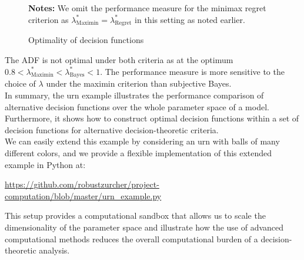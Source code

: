 \begin{figure}[h!]\centering
{}\vspace{-0.9cm}
\begin{center}
\begin{minipage}[t]{0.5\columnwidth}
\item \scriptsize{\textbf{Notes:} We omit the performance measure for the minimax regret criterion as $\lambda^*_{\text{Maximin}} = \lambda^*_{\text{Regret}}$ in this setting as noted earlier.}
\end{minipage}
\end{center}
\caption{Optimality of decision functions}\label{Optimality of decision functions for urn}
\end{figure}\FloatBarrier

The ADF is not optimal under both criteria as at the optimum  $0.8 < \lambda^*_{\text{Maximin}} < \lambda^*_{\text{Bayes}} < 1$. The performance measure is more sensitive to the choice of $\lambda$ under the maximin criterion than subjective Bayes.\\

In summary, the urn example illustrates the performance comparison of alternative decision functions over the whole parameter space of a model. Furthermore, it shows how to construct optimal decision functions within a set of decision functions for alternative decision-theoretic criteria.\\

We can easily extend this example by considering an urn with balls of many different colors, and we provide a flexible implementation of this extended example in Python at:

\begin{center}
\href{https://github.com/robustzurcher/project-computation/blob/master/implementation.py}{https://github.com/robustzurcher/project-computation/blob/master/urn\_example.py}
\end{center}

This setup provides a computational sandbox that allows us to scale the dimensionality of the parameter space and illustrate how the use of advanced computational methods reduces the overall computational burden of a decision-theoretic analysis.
